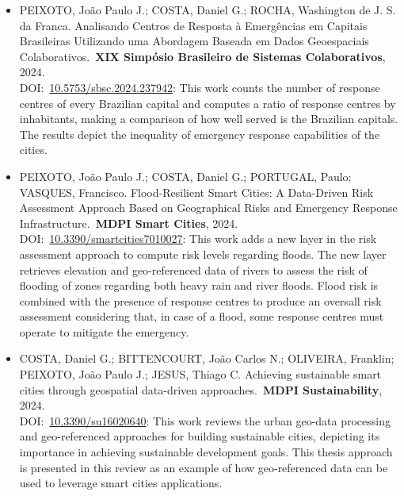 \begin{refsection}
\begin{itemize}
  \item \uppercase{Peixoto}, João Paulo J.; \uppercase{Costa}, Daniel G.; \uppercase{Rocha}, Washington de J. S. da Franca. Analisando Centros de Resposta à Emergências em Capitais Brasileiras Utilizando uma Abordagem Baseada em Dados Geoespaciais Colaborativos.\ \textbf{XIX Simpósio Brasileiro de Sistemas Colaborativos}, 2024.\\DOI:\ \hyperref{https://doi.org/10.5753/sbsc.2024.237942}{}{}{10.5753/sbsc.2024.237942}: This work counts the number of response centres of every Brazilian capital and computes a ratio of response centres by inhabitants, making a comparison of how well served is the Brazilian capitals. The results depict the inequality of emergency response capabilities of the cities.

  \item \uppercase{Peixoto}, João Paulo J.; \uppercase{Costa}, Daniel G.; \uppercase{Portugal}, Paulo; \uppercase{Vasques}, Francisco. Flood-Resilient Smart Cities: A Data-Driven Risk Assessment Approach Based on Geographical Risks and Emergency Response Infrastructure.\ \textbf{MDPI Smart Cities}, 2024. DOI:\ \hyperref{https://doi.org/10.3390/smartcities7010027}{}{}{10.3390/smartcities7010027}: This work adds a new layer in the risk assessment approach to compute risk levels regarding floods. The new layer retrieves elevation and geo-referenced data of rivers to assess the risk of flooding of zones regarding both heavy rain and river floods. Flood risk is combined with the presence of response centres to produce an oversall risk assessment considering that, in case of a flood, some response centres must operate to mitigate the emergency.

  \item \uppercase{Costa}, Daniel G.; \uppercase{Bittencourt}, João Carlos N.; \uppercase{Oliveira}, Franklin; \uppercase{Peixoto}, João Paulo J.; \uppercase{Jesus}, Thiago C. Achieving sustainable smart cities through geospatial data-driven approaches.\ \textbf{MDPI Sustainability}, 2024.\\DOI:\ \hyperref{https://doi.org/10.3390/su16020640}{}{}{10.3390/su16020640}: This work reviews the urban geo-data processing and geo-referenced approaches for building sustainable cities, depicting its importance in achieving sustainable development goals. This thesis approach is presented in this review as an example of how geo-referenced data can be used to leverage smart cities applications.
\end{itemize}


\end{refsection}
